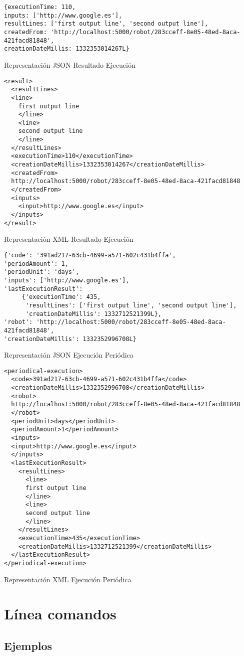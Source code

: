 \begin{table}
\begin{verbatim}
{executionTime: 110,
inputs: ['http://www.google.es'],
resultLines: ['first output line', 'second output line'],
createdFrom: 'http://localhost:5000/robot/283cceff-8e05-48ed-8aca-421facd81848',
creationDateMillis: 1332353014267L}
\end{verbatim}
\caption{Representación JSON Resultado Ejecución}
\label{execution_json_representation}
\end{table}

\begin{table}
\begin{verbatim}
<result>
  <resultLines>
  <line>
    first output line
    </line>
    <line>
    second output line
    </line>
  </resultLines>
  <executionTime>110</executionTime>
  <creationDateMillis>1332353014267</creationDateMillis>
  <createdFrom>
  http://localhost:5000/robot/283cceff-8e05-48ed-8aca-421facd81848
  </createdFrom>
  <inputs>
    <input>http://www.google.es</input>
  </inputs>
</result>
\end{verbatim}
\caption{Representación XML Resultado Ejecución}
\label{execution_xml_representation}
\end{table}

\begin{table}
\begin{verbatim}
{'code': '391ad217-63cb-4699-a571-602c431b4ffa',
'periodAmount': 1,
'periodUnit': 'days',
'inputs': ['http://www.google.es'],
'lastExecutionResult':
     {'executionTime': 435,
      'resultLines': ['first output line', 'second output line'],
      'creationDateMillis': 1332712521399L},
'robot': 'http://localhost:5000/robot/283cceff-8e05-48ed-8aca-421facd81848',
'creationDateMillis': 1332352996708L}
\end{verbatim}
\caption{Representación JSON Ejecución Periódica}
\label{periodical_execution_json_representation}
\end{table}

\begin{table}
\begin{verbatim}
<periodical-execution>
  <code>391ad217-63cb-4699-a571-602c431b4ffa</code>
  <creationDateMillis>1332352996708</creationDateMillis>
  <robot>
  http://localhost:5000/robot/283cceff-8e05-48ed-8aca-421facd81848
  </robot>
  <periodUnit>days</periodUnit>
  <periodAmount>1</periodAmount>
  <inputs>
  <input>http://www.google.es</input>
  </inputs>
  <lastExecutionResult>
    <resultLines>
      <line>
      first output line
      </line>
      <line>
      second output line
      </line>
    </resultLines>
    <executionTime>435</executionTime>
    <creationDateMillis>1332712521399</creationDateMillis>
  </lastExecutionResult>
</periodical-execution>
\end{verbatim}
\caption{Representación XML Ejecución Periódica}
\label{periodical_execution_xml_representation}
\end{table}

\newpage

\section{Línea comandos}
\subsection{Ejemplos}
